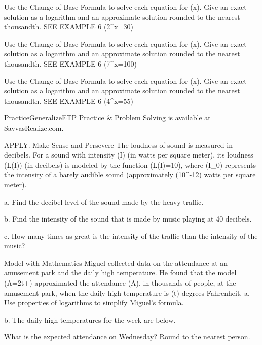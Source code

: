 \documentclass{article}
\newenvironment{practice}[2]{}{}        %
\newenvironment{te-addendum}[2]{}{}     %
\newcommand{\answer}[1]{}               %
\newcommand{\placeholder}[2]{}          %
\begin{document}
\begin{practice}{33}{1}
Use the Change of Base Formula to solve each equation for (x). Give an exact solution as a logarithm and an approximate solution rounded to the nearest thousandth. SEE EXAMPLE 6
(2^x=30)
\answer{(\frac{\log30}{\log2}); 4.907}
\end{practice}
\begin{practice}{34}{1}
Use the Change of Base Formula to solve each equation for (x). Give an exact solution as a logarithm and an approximate solution rounded to the nearest thousandth. SEE EXAMPLE 6
(7^x=100)
\answer{(\frac{\log100}{\log7}); 2.367}
\end{practice}
\begin{practice}{35}{1}
Use the Change of Base Formula to solve each equation for (x). Give an exact solution as a logarithm and an approximate solution rounded to the nearest thousandth. SEE EXAMPLE 6
(4^x=55)
\answer{(\frac{\log55}{\log4}); 2.891}
\end{practice}
\begin{te-addendum}{Practice}{GeneralizeETP}
Practice \& Problem Solving is available at SavvasRealize.com.
\end{te-addendum}
\begin{practice}{36}{2}
APPLY. Make Sense and Persevere The loudness of sound is measured in decibels. For a sound with intensity (I) (in watts per square meter), its loudness (L(I)) (in decibels) is modeled by the function (L(I)=10\log{}), where (I_0) represents the intensity of a barely audible sound (approximately (10^{-12}) watts per square meter).
\placeholder{illustration}{City street with heavy traffic including bus and cars, and a pedestrian listening through headphones. Callouts: Heavy Traffic: intensity of I=10^{-4} watts per square meter; Music through headphones: 40 dB.}
a. Find the decibel level of the sound made by the heavy traffic.
\answer{a. 80 dB}
b. Find the intensity of the sound that is made by music playing at 40 decibels.
\answer{b. (10^{-8}\ \mathrm{W/m^2})}
c. How many times as great is the intensity of the traffic than the intensity of the music?
\answer{c. 10,000 times}
\end{practice}
\begin{practice}{37}{2}
Model with Mathematics Miguel collected data on the attendance at an amusement park and the daily high temperature. He found that the model (A=2\log t+) approximated the attendance (A), in thousands of people, at the amusement park, when the daily high temperature is (t) degrees Fahrenheit.
a. Use properties of logarithms to simplify Miguel's formula.
\answer{a. (A=\log(5t^2))}
b. The daily high temperatures for the week are below.
\placeholder{illustration}{Five-day weather strip: Mon sunny 87 degrees high,66 low; Tue thunderstorms 73 high,67 low; Wed partly cloudy 65 high,61 low; Thu thunderstorms 72 high,57 low; Fri sunny 80 high,59 low. Caption: Daily temperatures show highs and lows in degrees F. High values black, lows blue.}
What is the expected attendance on Wednesday? Round to the nearest person.
\answer{b. 4,325 people}
\end{practice}
\end{document}
